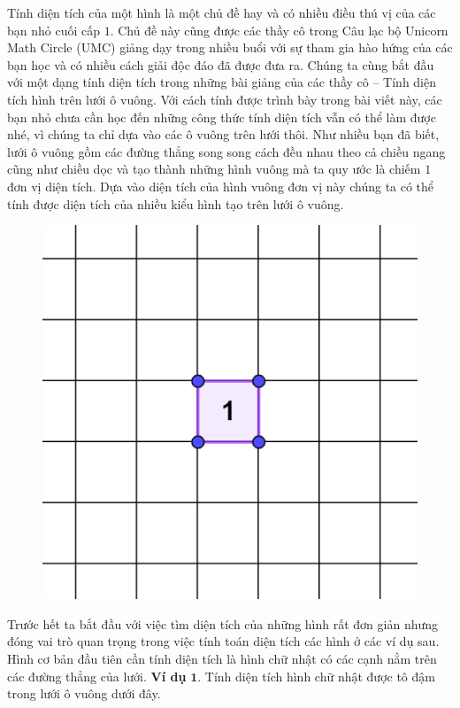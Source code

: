 \begin{multicols}{2}
	Tính diện tích của một hình là một chủ đề hay và có nhiều điều thú vị của các bạn nhỏ cuối cấp $1$. Chủ đề này cũng được các thầy cô trong Câu lạc bộ Unicorn Math Circle (UMC) giảng dạy trong nhiều buổi với sự tham gia hào hứng của các bạn học và có nhiều cách giải độc đáo đã được đưa ra. Chúng ta cùng bắt đầu với một dạng tính diện tích trong những bài giảng của các thầy cô -- Tính diện tích hình trên lưới ô vuông. Với cách tính được trình bày trong bài viết này, các bạn nhỏ chưa cần học đến những công thức tính diện tích vẫn có thể làm được nhé, vì chúng ta chỉ dựa vào các ô vuông trên lưới thôi.
	\vskip 0.1cm
	Như nhiều bạn đã biết, lưới ô vuông gồm các đường thẳng song song cách đều nhau theo cả chiều ngang cũng như chiều dọc và tạo thành những hình vuông mà ta quy ước là chiếm $1$ đơn vị diện tích. Dựa vào diện tích của hình vuông đơn vị này chúng ta có thể tính được diện tích của nhiều kiểu hình tạo trên lưới ô vuông.
	\begin{figure}[H]
		\centering
		\vspace*{-5pt}
		\captionsetup{labelformat= empty, justification=centering}
		\includegraphics[width=0.48\linewidth]{1}
		\vspace*{-2pt}
	\end{figure}
	Trước hết ta bắt đầu với việc tìm diện tích của những hình rất đơn giản nhưng đóng vai trò quan trọng trong việc tính toán diện tích các hình ở các ví dụ sau.
	\vskip 0.1cm
	Hình cơ bản đầu tiên cần tính diện tích là hình chữ nhật có các cạnh nằm trên các đường thẳng của lưới.
	\vskip 0.1cm
	\textbf{\color{toancuabi}Ví dụ} $\pmb{1.}$ Tính diện tích hình chữ nhật được tô đậm trong lưới ô vuông dưới đây.  
	\begin{figure}[H]
		\centering
		\vspace*{-5pt}
		\captionsetup{labelformat= empty, justification=centering}

\end{figure}
\end{multicols}
